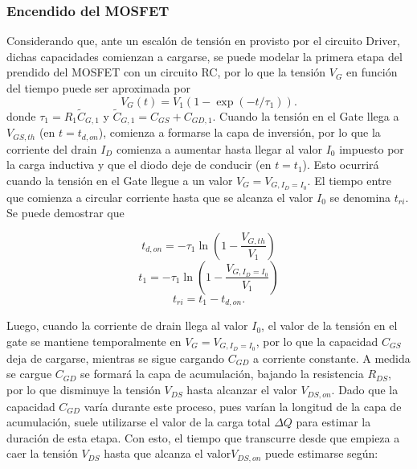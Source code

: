 \documentclass[e4_tp1_main.tex]{subfiles}
\begin{document}
\subsubsection{Encendido del MOSFET}

Considerando que, ante un escalón de tensión en provisto por el circuito Driver, dichas capacidades comienzan a cargarse, se puede modelar la primera etapa del prendido del MOSFET con un circuito RC, por lo que la tensión $V_{G}$ en función del tiempo puede ser aproximada por
\begin{equation}
V_G(t) = V_1 (1-\exp(-t/\tau_1)).
\end{equation}
donde $\tau_1 = R_1\tilde{C}_{G,1}$ y $\tilde{C}_{G,1} = C_{GS} + C_{GD,1}$. Cuando la tensión en el Gate llega a $V_{GS,th}$ (en $t=t_{d,on}$), comienza a formarse la capa de inversión, por lo que la corriente del drain $I_D$ comienza a aumentar hasta llegar al valor $I_0$ impuesto por la carga inductiva y que el diodo deje de conducir (en $t=t_1$). Esto ocurrirá cuando la tensión en el Gate llegue a un valor $V_G=V_{G,I_D=I_0}$. El tiempo entre que comienza a circular corriente hasta que se alcanza el valor $I_0$ se denomina $t_{ri}$. Se puede demostrar que

\begin{equation}
t_{d,on} = -\tau_1 \ln\left(1-\frac{V_{G,th}}{V_1}\right)
\end{equation}
\begin{equation}
t_{1} = -\tau_1 \ln\left(1-\frac{V_{G,I_D=I_0}}{V_1}\right)
\end{equation}
\begin{equation}
t_{ri} = t_{1} - t_{d,on}.
\end{equation}

Luego, cuando la corriente de drain llega al valor $I_0$, el valor de la tensión en el gate se mantiene temporalmente en $V_G=V_{G,I_D=I_0}$, por lo que la capacidad $C_{GS}$ deja de cargarse, mientras se sigue cargando $C_{GD}$ a corriente constante. A medida se cargue $C_{GD}$ se formará la capa de acumulación, bajando la resistencia $R_{DS}$, por lo que disminuye la tensión $V_{DS}$ hasta alcanzar el valor $V_{DS,on}$. Dado que la capacidad $C_{GD}$ varía durante este proceso, pues varían la longitud de la capa de acumulación, suele utilizarse el valor de la carga total $\Delta Q$ para estimar la duración de esta etapa. Con esto, el tiempo que transcurre desde que empieza a caer la tensión $V_{DS}$ hasta que alcanza el valor$V_{DS,on}$ puede estimarse según:
\end{document}

